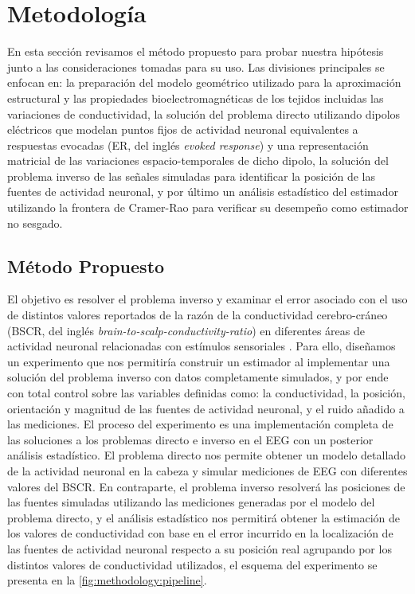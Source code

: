 %
\chapter{Metodología}
\label{sec:methodology}

En esta sección revisamos el método propuesto para probar nuestra hipótesis junto a las consideraciones tomadas para su uso.
Las divisiones principales se enfocan en: la preparación del modelo geométrico utilizado para la aproximación estructural y las propiedades bioelectromagnéticas de los tejidos incluidas las variaciones de conductividad, la solución del problema directo utilizando dipolos eléctricos que modelan puntos fijos de actividad neuronal equivalentes a respuestas evocadas (ER, del inglés \emph{evoked response}) y una representación matricial de las variaciones espacio-temporales de dicho dipolo, la solución del problema inverso de las señales simuladas para identificar la posición de las fuentes de actividad neuronal, y por último un análisis estadístico del estimador utilizando la frontera de Cramer-Rao para verificar su desempeño como estimador no sesgado.

\section{Método Propuesto}
\label{sec:methodology:method}

El objetivo es resolver el problema inverso y examinar el error asociado con el uso de distintos valores reportados de la razón de la conductividad cerebro-cráneo (BSCR, del inglés \emph{brain-to-scalp-conductivity-ratio}) en diferentes áreas de actividad neuronal relacionadas con estímulos sensoriales \cite{McCann2019}.
Para ello, diseñamos un experimento que nos permitiría construir un estimador al implementar una solución del problema inverso con datos completamente simulados, y por ende con total control sobre las variables definidas como: la conductividad, la posición, orientación y magnitud de las fuentes de actividad neuronal, y el ruido añadido a las mediciones.
El proceso del experimento es una implementación completa de las soluciones a los problemas directo e inverso en el EEG con un posterior análisis estadístico. 
El problema directo nos permite obtener un modelo detallado de la actividad neuronal en la cabeza y simular mediciones de EEG con diferentes valores del BSCR.
En contraparte, el problema inverso resolverá las posiciones de las fuentes simuladas utilizando las mediciones generadas por el modelo del problema directo, y el análisis estadístico nos permitirá obtener la estimación de los valores de conductividad con base en el error incurrido en la localización de las fuentes de actividad neuronal respecto a su posición real agrupando por los distintos valores de conductividad utilizados, el esquema del experimento se presenta en la \cref{fig:methodology:pipeline}.

